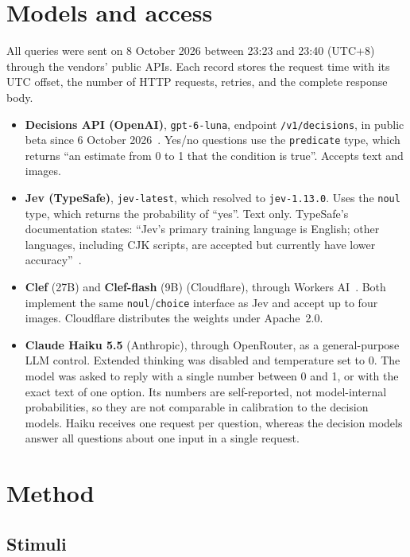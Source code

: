 \documentclass[11pt]{article}
\begin{document}
\section{Models and access}

All queries were sent on 8 October 2026 between 23:23 and 23:40 (UTC+8) through the vendors' public APIs. Each record stores the request time with its UTC offset, the number of HTTP requests, retries, and the complete response body.

\begin{itemize}
\item \textbf{Decisions API (OpenAI)}, \texttt{gpt-6-luna}, endpoint \texttt{/v1/decisions}, in public beta since 6 October 2026~\cite{openai}. Yes/no questions use the \texttt{predicate} type, which returns ``an estimate from 0 to 1 that the condition is true''. Accepts text and images.
\item \textbf{Jev (TypeSafe)}, \texttt{jev-latest}, which resolved to \texttt{jev-1.13.0}. Uses the \texttt{noul} type, which returns the probability of ``yes''. Text only. TypeSafe's documentation states: ``Jev's primary training language is English; other languages, including CJK scripts, are accepted but currently have lower accuracy''~\cite{typesafedocs}.
\item \textbf{Clef} (27B) and \textbf{Clef-flash} (9B) (Cloudflare), through Workers AI~\cite{cloudflare}. Both implement the same \texttt{noul}/\texttt{choice} interface as Jev and accept up to four images. Cloudflare distributes the weights under Apache~2.0.
\item \textbf{Claude Haiku 5.5} (Anthropic), through OpenRouter, as a general-purpose LLM control. Extended thinking was disabled and temperature set to 0. The model was asked to reply with a single number between 0 and 1, or with the exact text of one option. Its numbers are self-reported, not model-internal probabilities, so they are not comparable in calibration to the decision models. Haiku receives one request per question, whereas the decision models answer all questions about one input in a single request.
\end{itemize}

\section{Method}

\subsection{Stimuli}
\end{document}
